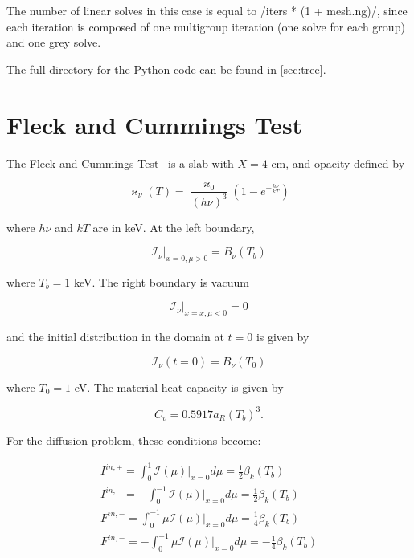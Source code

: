 \documentclass{template}
\newcommand{\I}{\mathcal{I}}
\begin{document}
The number of linear solves in this case is equal to {\pythoninline/iters * (1 + mesh.ng)/}, since each iteration is composed of one multigroup iteration (one solve for each group) and one grey solve.


The full directory for the Python code can be found in \autoref{sec:tree}.




\section{Fleck and Cummings Test}

The Fleck and Cummings Test~\cite{fleck1971implicit} is a slab with $X=4$ cm, and opacity defined by

\begin{equation}
    \varkappa_\nu(T) = \frac{\varkappa_0}{{(h\nu)}^3}\left(1 - e^{-\frac{h\nu}{kT}} \right)
\end{equation}

where $h\nu$ and $kT$ are in keV. At the left boundary, 

\begin{equation}
    \I_\nu|_{x=0, \mu > 0} = B_\nu(T_b)
\end{equation}

where $T_b = 1$ keV. The right boundary is vacuum

\begin{equation}
    \I_\nu|_{x=x, \mu < 0} = 0
\end{equation}

and the initial distribution in the domain at $t=0$ is given by

\begin{equation}
    \I_\nu (t=0) = B_\nu (T_0)
\end{equation}

where $T_0 = 1$ eV. The material heat capacity is given by

\begin{equation}
    C_v = 0.5917a_R (T_b)^3.
\end{equation}

For the diffusion problem, these conditions become:

\begin{gather}
    I^{in, +} = \int_{0}^{1}\I(\mu)|_{x=0} d\mu = \frac{1}{2}\beta_k (T_b)\\
    I^{in, -} = -\int_{0}^{-1}\I(\mu)|_{x=0} d\mu = \frac{1}{2}\beta_k (T_b)\\
    F^{in, -} = \int_{0}^{-1}\mu\I(\mu)|_{x=0} d\mu = \frac{1}{4}\beta_k (T_b)\\
    F^{in, -} = -\int_{0}^{-1}\mu\I(\mu)|_{x=0} d\mu = -\frac{1}{4}\beta_k (T_b)
\end{gather}
\end{document}
